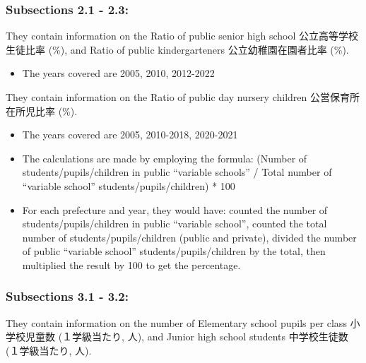 \documentclass[
  12pt,
  letterpaper,
  DIV=11,
  numbers=noendperiod]{scrartcl}
\providecommand{\tightlist}{%
  \setlength{\itemsep}{0pt}\setlength{\parskip}{0pt}}\usepackage{longtable,booktabs,array}
\begin{document}
\hypertarget{subsections-2.1---2.3-1}{%
\subsubsection{Subsections 2.1 - 2.3:}\label{subsections-2.1---2.3-1}}

They contain information on the Ratio of public senior high school
公立高等学校生徒比率 (\%), and Ratio of public kindergarteners
公立幼稚園在園者比率 (\%).

\begin{itemize}
\tightlist
\item
  The years covered are 2005, 2010, 2012-2022
\end{itemize}

They contain information on the Ratio of public day nursery children
公営保育所在所児比率 (\%).

\begin{itemize}
\item
  The years covered are 2005, 2010-2018, 2020-2021
\item
  The calculations are made by employing the formula: (Number of
  students/pupils/children in public ``variable schools'' / Total number
  of ``variable school'' students/pupils/children) * 100
\item
  For each prefecture and year, they would have: counted the number of
  students/pupils/children in public ``variable school'', counted the
  total number of students/pupils/children (public and private), divided
  the number of public ``variable school'' students/pupils/children by
  the total, then multiplied the result by 100 to get the percentage.
\end{itemize}

\hypertarget{subsections-3.1---3.2}{%
\subsubsection{Subsections 3.1 - 3.2:}\label{subsections-3.1---3.2}}

They contain information on the number of Elementary school pupils per
class 小学校児童数 (１学級当たり, 人), and Junior high school students
中学校生徒数 (１学級当たり, 人).
\end{document}
